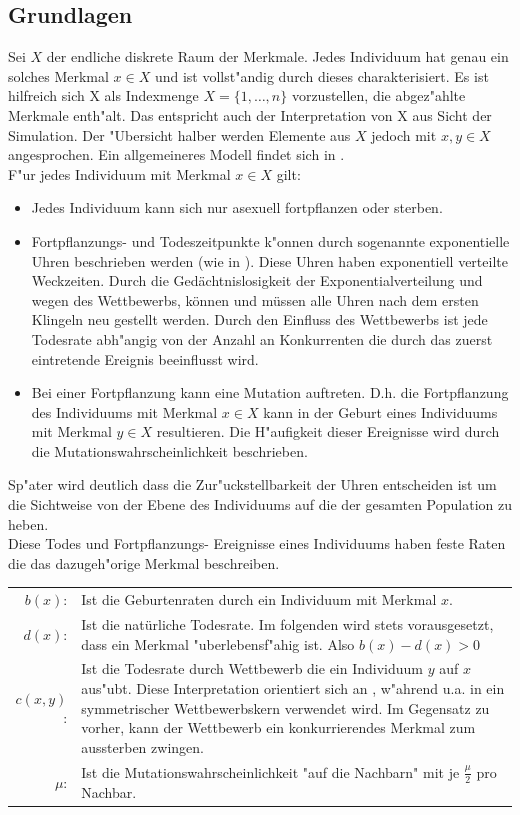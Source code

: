 \documentclass[11pt, a4paper, german]{article}
\theoremstyle{plain}
\begin{document}
	\subsection{Grundlagen}
	Sei $ X $ der endliche diskrete Raum der Merkmale. Jedes Individuum hat genau ein solches Merkmal $ x \in X $ und ist vollst"andig durch dieses charakterisiert. Es ist hilfreich sich X als Indexmenge $ X = \{1,\dots, n\} $ vorzustellen, die abgez"ahlte Merkmale enth"alt. Das entspricht auch der Interpretation von X aus Sicht der Simulation. Der "Ubersicht halber werden Elemente aus $ X $ jedoch mit $ x,y \in X $ angesprochen. Ein allgemeineres Modell findet sich in \cite{raey}.\\
	F"ur jedes Individuum mit Merkmal $ x \in X $ gilt:
	\begin{itemize}
		\item Jedes Individuum kann sich nur asexuell fortpflanzen oder sterben.
		\item Fortpflanzungs- und Todeszeitpunkte k"onnen durch sogenannte exponentielle Uhren beschrieben werden (wie in \cite[S. 3]{fournier2004microscopic}). Diese Uhren haben exponentiell verteilte Weckzeiten. Durch die Gedächtnislosigkeit der Exponentialverteilung und wegen des Wettbewerbs, können und müssen alle Uhren nach dem ersten Klingeln neu gestellt werden. Durch den Einfluss des Wettbewerbs ist jede Todesrate abh"angig von der Anzahl an Konkurrenten die durch das zuerst eintretende Ereignis beeinflusst wird. 
		\item Bei einer Fortpflanzung kann eine Mutation auftreten. D.h. die Fortpflanzung des Individuums mit Merkmal $ x \in X $ kann in der Geburt eines Individuums mit Merkmal $ y \in X $ resultieren. Die H"aufigkeit dieser Ereignisse wird durch die Mutationswahrscheinlichkeit beschrieben.
	\end{itemize}
	Sp"ater wird deutlich dass die Zur"uckstellbarkeit der Uhren entscheiden ist um die Sichtweise von der Ebene des Individuums auf die der gesamten Population zu heben.\\
	Diese Todes und Fortpflanzungs- Ereignisse eines Individuums haben feste Raten die das dazugeh"orige Merkmal beschreiben.\\
	
	\begin{tabular}{r p{26em}}
		$ b(x) $: & Ist die Geburtenraten durch ein Individuum mit Merkmal $ x $.\\
		$ d(x) $: & Ist die natürliche Todesrate. Im folgenden wird stets vorausgesetzt, dass ein Merkmal "uberlebensf"ahig ist. Also $ b(x) - d(x) > 0 $\\
		$ c(x, y) $: & Ist die Todesrate durch Wettbewerb die ein Individuum $ y $ auf $ x $ aus"ubt. Diese Interpretation orientiert sich an \cite{raey}, w"ahrend u.a. in \cite{Champagnat20061127} ein symmetrischer Wettbewerbskern verwendet wird. Im Gegensatz zu vorher, kann der Wettbewerb ein konkurrierendes Merkmal zum aussterben zwingen.\\
		$ \mu $: & Ist die Mutationswahrscheinlichkeit "{}auf die Nachbarn"{} mit je $ \frac{\mu}{2} $ pro Nachbar. \\
	\end{tabular}\\
\end{document}

